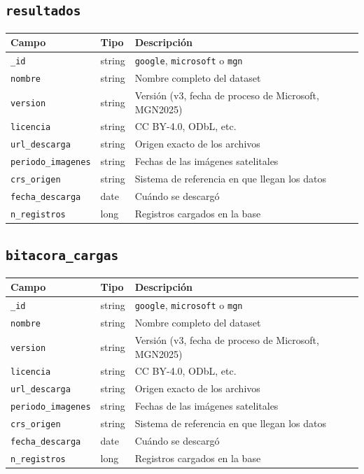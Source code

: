 \documentclass[11pt,a4paper]{article}
\newcommand{\campo}[1]{\texttt{#1}}
\begin{document}
\subsection{\texorpdfstring{\campo{resultados}}{resultados}}

\begin{table}[H]
\centering\small
\begin{tabularx}{\textwidth}{@{}p{3.4cm}p{2.4cm}L@{}}
\toprule
\textbf{Campo} & \textbf{Tipo} & \textbf{Descripción} \\
\midrule
\campo{\_id} & string & \campo{google}, \campo{microsoft} o \campo{mgn} \\
\campo{nombre} & string & Nombre completo del dataset \\
\campo{version} & string & Versión (v3, fecha de proceso de Microsoft, MGN2025) \\
\campo{licencia} & string & CC BY-4.0, ODbL, etc. \\
\campo{url\_descarga} & string & Origen exacto de los archivos \\
\campo{periodo\_imagenes} & string & Fechas de las imágenes satelitales \\
\campo{crs\_origen} & string & Sistema de referencia en que llegan los datos \\
\campo{fecha\_descarga} & date & Cuándo se descargó \\
\campo{n\_registros} & long & Registros cargados en la base \\
\bottomrule
\end{tabularx}
\end{table}

\subsection{\texorpdfstring{\campo{bitacora\_cargas}}{bitacora\_cargas}}

\begin{table}[H]
\centering\small
\begin{tabularx}{\textwidth}{@{}p{3.4cm}p{2.4cm}L@{}}
\toprule
\textbf{Campo} & \textbf{Tipo} & \textbf{Descripción} \\
\midrule
\campo{\_id} & string & \campo{google}, \campo{microsoft} o \campo{mgn} \\
\campo{nombre} & string & Nombre completo del dataset \\
\campo{version} & string & Versión (v3, fecha de proceso de Microsoft, MGN2025) \\
\campo{licencia} & string & CC BY-4.0, ODbL, etc. \\
\campo{url\_descarga} & string & Origen exacto de los archivos \\
\campo{periodo\_imagenes} & string & Fechas de las imágenes satelitales \\
\campo{crs\_origen} & string & Sistema de referencia en que llegan los datos \\
\campo{fecha\_descarga} & date & Cuándo se descargó \\
\campo{n\_registros} & long & Registros cargados en la base \\
\bottomrule
\end{tabularx}
\end{table}
\end{document}
